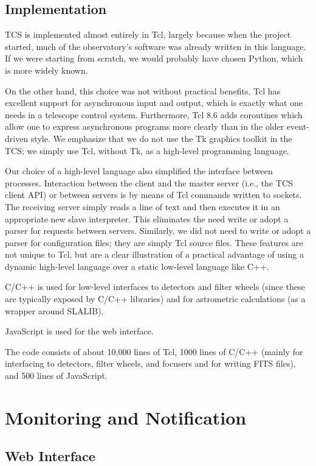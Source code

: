 \documentclass{article}
\begin{document}
\subsection{Implementation}

TCS is implemented almost entirely in Tcl, largely because when the project started, much of the observatory's software was already written in this language. If we were starting from scratch, we would probably have chosen Python, which is more widely known. 

On the other hand, this choice was not without practical benefits. Tcl has excellent support for asynchronous input and output, which is exactly what one needs in a telescope control system. Furthermore, Tcl 8.6 adds coroutines which allow one to express asynchronous programs more clearly than in the older event-driven style. We emphasize that we do not use the Tk graphics toolkit in the TCS; we simply use Tcl, without Tk, as a high-level programming language.

Our choice of a high-level language also simplified the interface between processes. Interaction between the client and the master server (i.e., the TCS client API) or between servers is by means of Tcl commands written to sockets. The receiving server simply reads a line of text and then executes it in an appropriate new slave interpreter. This eliminates the need write or adopt a parser for requests between servers. Similarly, we did not need to write or adopt a parser for configuration files; they are simply Tcl source files. These features are not unique to Tcl, but are a clear illustration of a practical advantage of using a dynamic high-level language over a static low-level language like C++. 

C/C++ is used for low-level interfaces to detectors and filter wheels (since these are typically exposed by C/C++ libraries) and for astrometric calculations (as a wrapper around SLALIB).

JavaScript is used for the web interface.

The code consists of about 10,000 lines of Tcl, 1000 lines of C/C++ (mainly for interfacing to detectors, filter wheels, and focusers and for writing FITS files), and 500 lines of JavaScript.

\section{Monitoring and Notification}

\subsection{Web Interface}
\end{document}
